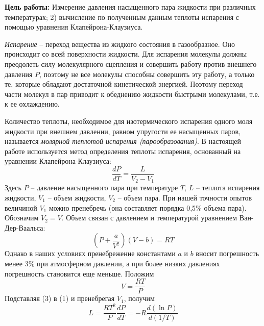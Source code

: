\documentclass[a4paper, 12pt]{article}
\theoremstyle{plain} %
\theoremstyle{definition} %
\theoremstyle{remark} %
\begin{document}
\textbf{Цель работы:} Измерение давления насыщенного пара жидкости при различных температурах; 2) вычисление по полученным данным теплоты испарения с помощью уравнения Клапейрона-Клаузиуса.

\textit{Испарение} -- переход вещества из жидкого состояния в газообразное. Оно происходит со всей поверхности жидкости. Для испарения молекулы должны преодолеть силу молекулярного сцепления и совершить работу против внешнего давления $P$, поэтому не все молекулы способны совершить эту работу, а только те, которые обладают достаточной кинетической энергией. Поэтому переход части молекул в пар приводит к обеднению жидкости быстрыми молекулами, т.е. к ее охлаждению.

Количество теплоты, необходимое для изотермического испарения одного моля жидкости при внешнем давлении, равном упругости ее насыщенных паров, называется \textit{молярной теплотой испарения (парообразования)}. В настоящей работе используется метод определения теплоты испарения, основанный на уравнении Клапейрона-Клаузиуса:
\begin{equation}
\dfrac{dP}{dT} = \dfrac{L}{V_{2} - V_{1}}
\end{equation}
Здесь $P$ -- давление насыщенного пара при температуре $T$, $L$ -- теплота испарения жидкости, $V_1$ -- объем жидкости, $V_2$ -- объем пара. При нашей точности опытов величиной $V_1$ можно пренебречь (она составляет порядка 0,5\% объема пара). Обозначим $V_2 = V$. Объем связан с давлением и температурой уравнением Ван-Дер-Ваальса:
\begin{equation}
(P + \frac{a}{V^2})(V - b) = RT
\end{equation}
Однако в наших условиях пренебрежение константами $a$ и $b$ вносит погрешность менее 3\% при атмосферном давлении, а при более низких давлениях погрешность становится еще меньше. Положим
\begin{equation}
V = \dfrac{RT}{P}
\end{equation} 
Подставляя (3) в (1) и пренебрегая $V_1$, получим
\begin{equation}
L = \frac{RT^2}{P}\frac{dP}{dT} = -R\frac{d(\ln P)}{d(1/T)}
\end{equation}
\newpage
\end{document}
